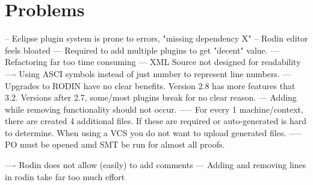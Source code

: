 \section{Problems}
-- Eclipse plugin system is prone to errors, "missing dependency X"
-- Rodin editor feels bloated
--- Required to add multiple plugins to get "decent" value.
--- Refactoring far too time consuming
--- XML Source not designed for readability
---- Using ASCI symbols instead of just number to represent line numbers.
--- Upgrades to RODIN have no clear benefits. Version 2.8 has more features that 3.2. Versions after 2.7, some/most plugins break for no clear reason.
--- Adding while removing functionality should not occur. 
----- For every 1 machine/context, there are created 4 additional files. If these are required or auto-generated is hard to determine. When using a VCS you do not want to upload generated files.  
----- PO must be opened amd SMT be run for almost all proofs.

---- Rodin does not allow (easily) to add comments
--- Adding and removing lines in rodin take far too much effort
